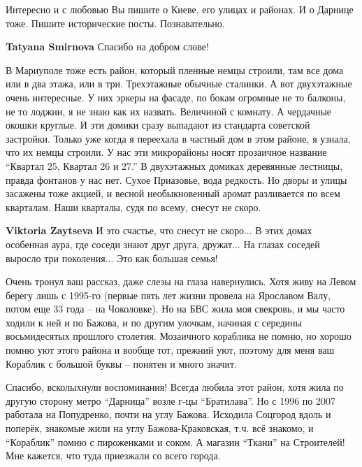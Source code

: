 \begin{itemize}

Интересно и с любовью Вы пишите о Киеве, его улицах и районах. И о Дарнице
тоже. Пишите исторические посты. Познавательно.

\textbf{Tatyana Smirnova} Спасибо на добром слове!


В Мариуполе тоже есть район, который пленные немцы строили, там все дома или в
два этажа, или в три. Трехэтажные обычные сталинки. А вот двухэтажные очень
интересные. У них эркеры на фасаде, по бокам огромные не то балконы, не то
лоджии, я не знаю как их назвать. Величиной с комнату. А чердачные окошки
круглые. И эти домики сразу выпадают из стандарта советской застройки. Только
уже когда я переехала в частный дом в этом районе, я узнала, что их немцы
строили. У нас эти микрорайоны носят прозаичное название \enquote{Квартал 25, Квартал
26 и 27.} В двухэтажных домиках деревянные лестницы, правда фонтанов у нас нет.
Сухое Приазовье, вода редкость. Но дворы и улицы засажены тоже акцией, и весной
необыкновенный аромат разливается по всем кварталам. Наши кварталы, судя по
всему, снесут не скоро.

\begin{itemize} %
\textbf{Viktoria Zaytseva}
И это счастье, что снесут не скоро...
В этих домах особенная аура, где соседи знают друг друга, дружат...
На глазах соседей выросло три поколения...
Это как большая семья!
\end{itemize} %


Очень тронул ваш рассказ, даже слезы на глаза навернулись. Хотя живу на Левом
берегу лишь с 1995-го (первые пять лет жизни провела на Ярославом Валу, потом
еще 33 года – на Чоколовке). Но на БВС жила моя свекровь, и мы часто ходили к
ней и по Бажова, и по другим улочкам, начиная с середины восьмидесятых прошлого
столетия. Мозаичного кораблика не помню, но хорошо помню уют этого района и
вообще тот, прежний уют, поэтому для меня ваш Кораблик с большой буквы –
понятен и много значит.


Спасибо, всколыхнули воспоминания! Всегда любила этот район, хотя жила по
другую сторону метро \enquote{Дарница} возле г-цы \enquote{Братилава}. Но с 1996 по 2007
работала на Попудренко, почти на углу Бажова. Исходила Соцгород вдоль и
поперёк, знакомые жили на углу Бажова-Краковская, т.ч. всё знакомо, и
\enquote{Кораблик} помню с пироженками и соком. А магазин \enquote{Ткани} на Строителей! Мне
кажется, что туда приезжали со всего города.


\end{itemize}
